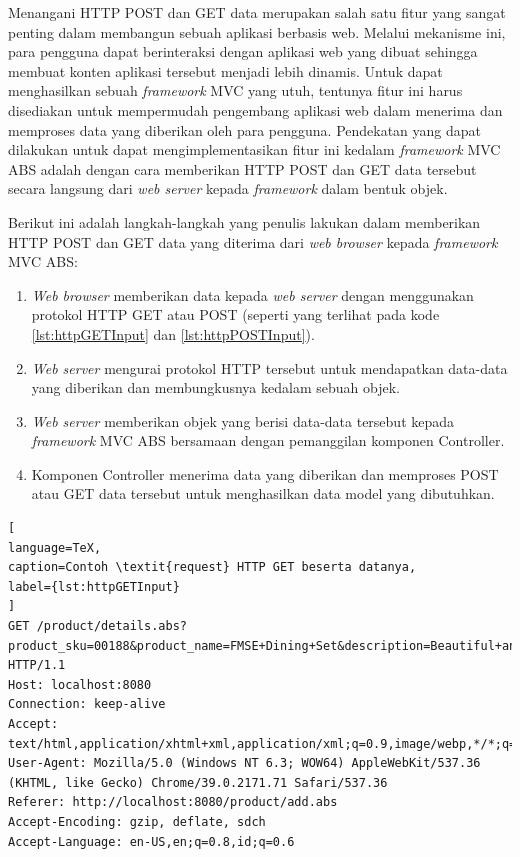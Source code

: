 Menangani HTTP POST dan GET data merupakan salah satu fitur yang sangat penting dalam membangun sebuah aplikasi berbasis web. Melalui mekanisme ini, para pengguna dapat berinteraksi dengan aplikasi web yang dibuat sehingga membuat konten aplikasi tersebut menjadi lebih dinamis. Untuk dapat menghasilkan sebuah \textit{framework} MVC yang utuh, tentunya fitur ini harus disediakan untuk mempermudah pengembang aplikasi web dalam menerima dan memproses data yang diberikan oleh para pengguna. Pendekatan yang dapat dilakukan untuk dapat mengimplementasikan fitur ini kedalam \textit{framework} MVC ABS adalah dengan cara memberikan HTTP POST dan GET data tersebut secara langsung dari \textit{web server} kepada \textit{framework} dalam bentuk objek.

Berikut ini adalah langkah-langkah yang penulis lakukan dalam memberikan HTTP POST dan GET data yang diterima dari \textit{web browser} kepada \textit{framework} MVC ABS:

\begin{enumerate}
    \item \textit{Web browser} memberikan data kepada \textit{web server} dengan menggunakan protokol HTTP GET atau POST (seperti yang terlihat pada kode \ref{lst:httpGETInput} dan \ref{lst:httpPOSTInput}).
    \item \textit{Web server} mengurai protokol HTTP tersebut untuk mendapatkan data-data yang diberikan dan membungkusnya kedalam sebuah objek.
    \item \textit{Web server} memberikan objek yang berisi data-data tersebut kepada \textit{framework} MVC ABS bersamaan dengan pemanggilan komponen Controller.
    \item Komponen Controller menerima data yang diberikan dan memproses POST atau GET data tersebut untuk menghasilkan data model yang dibutuhkan.
\end{enumerate}

\begin{lstlisting}[
language=TeX,
caption=Contoh \textit{request} HTTP GET beserta datanya,
label={lst:httpGETInput}
]
GET /product/details.abs?product_sku=00188&product_name=FMSE+Dining+Set&description=Beautiful+and+Cute+Dining+Set&price=250000 HTTP/1.1
Host: localhost:8080
Connection: keep-alive
Accept: text/html,application/xhtml+xml,application/xml;q=0.9,image/webp,*/*;q=0.8
User-Agent: Mozilla/5.0 (Windows NT 6.3; WOW64) AppleWebKit/537.36 (KHTML, like Gecko) Chrome/39.0.2171.71 Safari/537.36
Referer: http://localhost:8080/product/add.abs
Accept-Encoding: gzip, deflate, sdch
Accept-Language: en-US,en;q=0.8,id;q=0.6
\end{lstlisting}

